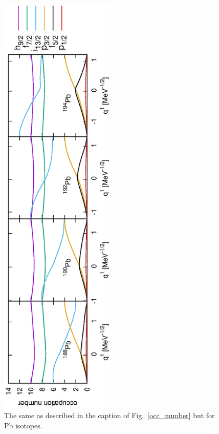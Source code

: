 \documentclass[11pt]{book} %
\begin{document}
\begin{figure}[tb]
 \begin{center}
  \includegraphics[width=55mm,angle=-90]{images/Pbocc_number.eps}
 \end{center}
	\caption{The same as described in the caption of Fig.~\ref{occ_number} but for Pb isotopes.
}
 \label{Pb_occ_number}
\end{figure}
\end{document}
